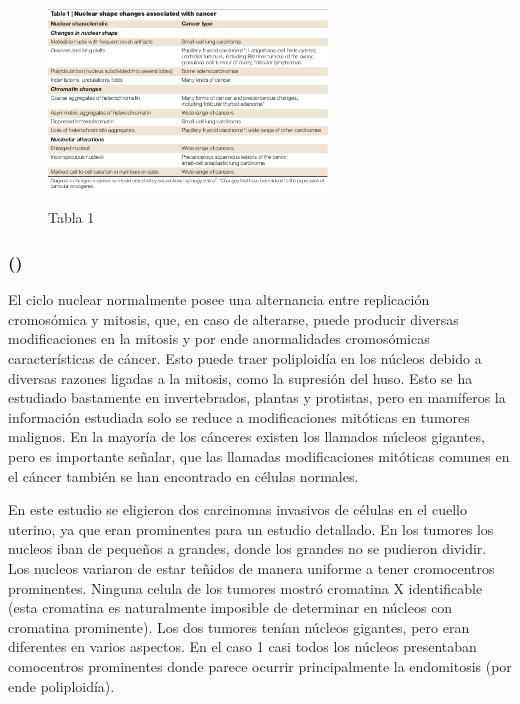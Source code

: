 \documentclass[12pt, letterpaper]{article}
\begin{document}
\begin{figure}[h]
\centering
	\includegraphics[width=7.5cm]{table-1-zinkNuclearStructureCancer2004.png}
	\label{fig: zink-table-1}
	\caption{Tabla 1}
	\autocite{zinkNuclearStructureCancer2004}
\end{figure}
\newpage

\subsubsection{\texorpdfstring{ (\citeauthor{thermanStructureOriginGiant1983})}{}}

El ciclo nuclear normalmente posee una alternancia entre replicación cromosómica y mitosis, que, en caso de alterarse, puede producir diversas modificaciones en la mitosis y por ende anormalidades cromosómicas características de cáncer. Esto puede traer poliploidía en los núcleos debido a diversas razones ligadas a la mitosis, como la supresión del huso. Esto se ha estudiado bastamente en invertebrados, plantas y protistas, pero en mamíferos la información estudiada solo se reduce a modificaciones mitóticas en tumores malignos. En la mayoría de los cánceres existen los llamados núcleos gigantes, pero es importante señalar, que las llamadas modificaciones mitóticas comunes en el cáncer también se han encontrado en células normales.


En este estudio se eligieron dos carcinomas invasivos de células en el cuello uterino, ya que eran prominentes para un estudio detallado. En los tumores los nucleos iban de pequeños a grandes, donde los grandes no se pudieron dividir. Los nucleos variaron de estar teñidos de manera uniforme a tener cromocentros prominentes. Ninguna celula de los tumores mostró cromatina X identificable (esta cromatina es naturalmente imposible de determinar en núcleos con cromatina prominente). Los dos tumores tenían núcleos gigantes, pero eran diferentes en varios aspectos. En el caso 1 casi todos los núcleos presentaban comocentros prominentes donde parece ocurrir principalmente la endomitosis (por ende poliploidía).
\end{document}
